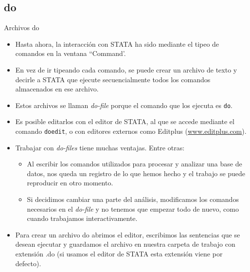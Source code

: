 \documentclass{beamer}
\begin{document}
\subsection{do}
\begin{frame}[allowframebreaks]{Archivos do}
\begin{itemize}

\item Hasta ahora, la interacción con STATA ha sido mediante el tipeo de comandos en la ventana ``Command'.
\item En vez de ir tipeando cada comando, se puede crear un archivo de texto y decirle a STATA que ejecute secuencialmente todos los comandos almacenados en ese archivo. 
\item Estos archivos se llaman \textit{do-file} porque el comando que los ejecuta es \texttt{do}.
\item Es posible editarlos con el editor de STATA, al que se accede mediante el comando \texttt{doedit}, o con editores externos como Editplus (\url{www.editplus.com}).
\item Trabajar con \textit{do-files} tiene muchas ventajas. Entre otras: 

\begin{itemize}
\item Al escribir los comandos utilizados para procesar y analizar una base de datos, nos queda un registro de lo que hemos hecho y el trabajo se puede reproducir en otro momento.
\item Si decidimos cambiar una parte del análisis, modificamos los comandos necesarios en el \textit{do-file} y no tenemos que empezar todo de nuevo, como cuando trabajamos interactivamente.
\end{itemize}

\item Para crear un archivo do abrimos el editor, escribimos las sentencias que se desean ejecutar y guardamos el archivo en nuestra carpeta de trabajo con extensión .do (si usamos el editor de STATA esta extensión viene por defecto).


\end{itemize}
\end{frame}
\end{document}
